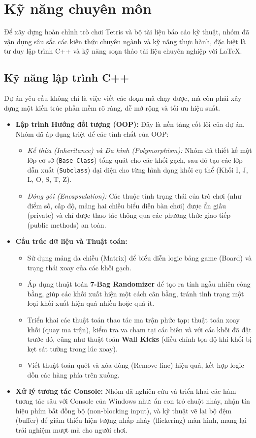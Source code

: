 \section{Kỹ năng chuyên môn}

Để xây dựng hoàn chỉnh trò chơi Tetris và bộ tài liệu báo cáo kỹ thuật, nhóm đã vận dụng sâu sắc các kiến thức chuyên ngành và kỹ năng thực hành, đặc biệt là tư duy lập trình C++ và kỹ năng soạn thảo tài liệu chuyên nghiệp với \LaTeX.

\subsection{Kỹ năng lập trình C++}
Dự án yêu cầu không chỉ là việc viết các đoạn mã chạy được, mà còn phải xây dựng một kiến trúc phần mềm rõ ràng, dễ mở rộng và tối ưu hiệu suất.
\begin{itemize}
    \item \textbf{Lập trình Hướng đối tượng (OOP):} Đây là nền tảng cốt lõi của dự án. Nhóm đã áp dụng triệt để các tính chất của OOP:
    \begin{itemize}
        \item \textit{Kế thừa (Inheritance) và Đa hình (Polymorphism):} Nhóm đã thiết kế một lớp cơ sở (\texttt{Base Class}) tổng quát cho các khối gạch, sau đó tạo các lớp dẫn xuất (\texttt{Subclass}) đại diện cho từng hình dạng khối cụ thể (Khối I, J, L, O, S, T, Z).
        \item \textit{Đóng gói (Encapsulation):} Các thuộc tính trạng thái của trò chơi (như điểm số, cấp độ, mảng hai chiều biểu diễn bàn chơi) được ẩn giấu (private) và chỉ được thao tác thông qua các phương thức giao tiếp (public methods) an toàn.
    \end{itemize}
    \item \textbf{Cấu trúc dữ liệu và Thuật toán:}
    \begin{itemize}
        \item Sử dụng mảng đa chiều (Matrix) để biểu diễn logic bảng game (Board) và trạng thái xoay của các khối gạch.
        \item Áp dụng thuật toán \textbf{7-Bag Randomizer} để tạo ra tính ngẫu nhiên công bằng, giúp các khối xuất hiện một cách cân bằng, tránh tình trạng một loại khối xuất hiện quá nhiều hoặc quá ít.
        \item Triển khai các thuật toán thao tác ma trận phức tạp: thuật toán xoay khối (quay ma trận), kiểm tra va chạm tại các biên và với các khối đã đặt trước đó, cũng như thuật toán \textbf{Wall Kicks} (điều chỉnh tọa độ khi khối bị kẹt sát tường trong lúc xoay).
        \item Viết thuật toán quét và xóa dòng (Remove line) hiệu quả, kết hợp logic dồn các hàng phía trên xuống.
    \end{itemize}
    \item \textbf{Xử lý tương tác Console:} Nhóm đã nghiên cứu và triển khai các hàm tương tác sâu với Console của Windows như: ẩn con trỏ chuột nháy, nhận tín hiệu phím bất đồng bộ (non-blocking input), và kỹ thuật vẽ lại bộ đệm (buffer) để giảm thiểu hiện tượng nhấp nháy (flickering) màn hình, mang lại trải nghiệm mượt mà cho người chơi.
\end{itemize}

